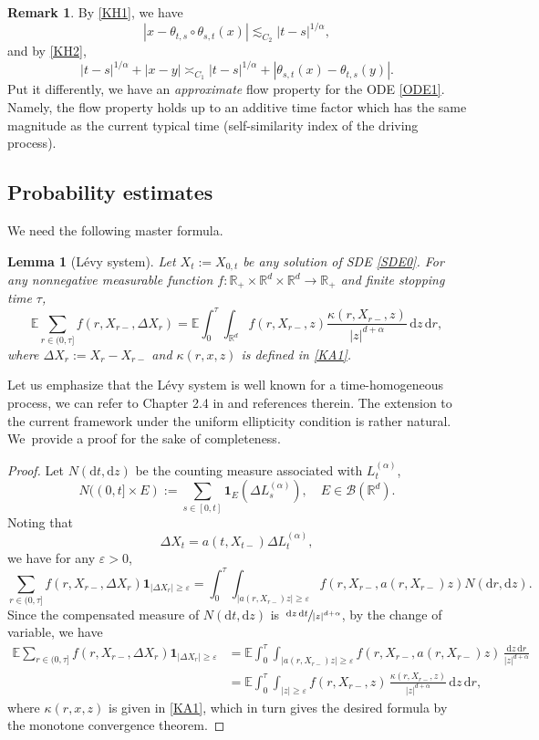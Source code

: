 \documentclass[JEP,XML,SOM,Unicode,published]{cedram}
\newcommand{\rd}{\mathrm{d}}
\theoremstyle{plain}
\newtheorem{lemma}[theorem]{Lemma}
\theoremstyle{definition}
\newtheorem{remark}[theorem]{Remark}
\let\eps\varepsilon
\newcommand\mE{\mathbb{E}}
\newcommand\mR{\mathbb{R}}
\newcommand\1{{\mathbf{1}}}
\newcommand\sB{{\mathscr B}}
\newcommand{\dif}{\,\mathrm{d}}
\begin{document}
\begin{remark}
By \eqref{KH1}, we have
\begin{equation*}%
|x-\theta_{t,s}\circ\theta_{s,t}(x)|\lesssim_{C_2} |t-s|^{1/\alpha},
\end{equation*}
and by \eqref{KH2},
\begin{equation}\label{KH22}
|t-s|^{1/\alpha}+|x-y|\asymp_{C_1}|t-s|^{1/\alpha}+|\theta_{s,t}(x)-\theta_{t,s}(y)|.
\end{equation}
Put it differently, we have an \textit{approximate} flow property for the ODE \eqref{ODE1}. Namely, the flow property holds up to an additive time factor which has the same magnitude as the current typical time (self-similarity index of the driving process).
\end{remark}
\subsection{Probability estimates}

We need the following master formula.
\begin{lemma}[Lévy system]\label{Le24}
Let $X_t:=X_{0,t}$ be any solution of SDE \eqref{SDE0}.
For any nonnegative measurable function $f: \mR_+\times\mR^d\times\mR^d\to\mR_+$ and finite stopping time $\tau$,
\[
\mE\sum_{r\in(0,\tau]}f(r, X_{r-}, \Delta X_r)=\mE\int^\tau_0\!\!\!\int_{\mR^d}f(r, X_{r-}, z)\frac{\kappa(r,X_{r-},z)}{|z|^{d+\alpha}}\dif z\dif r,
\]
where $\Delta X_r:=X_r-X_{r-}$ and $\kappa(r,x,z)$ is defined in \eqref{KA1}.
\end{lemma}
Let us emphasize that the Lévy system is well known for a time-homogeneous process, we can \eg refer to Chapter 2.4 in \cite{bott:schi:wang:13} and references therein. The extension to the current framework under the uniform ellipticity condition is rather natural. We~provide a proof for the sake of completeness.
\begin{proof}
Let $N(\rd t,\rd z)$ be the counting measure associated with $L^{(\alpha)}_t$, \ie
\[
N((0,t]\times E):=\sum_{s\in[0,t]}\1_E(\Delta L^{(\alpha)}_s),\quad E\in\sB(\mR^d).
\]
Noting that
\[
\Delta X_t=a(t,X_{t-})\Delta L^{(\alpha)}_t,
\]
we have for any $\eps>0$,
\[
\sum_{r\in(0,\tau]}f(r, X_{r-}, \Delta X_r)
\1_{|\Delta X_r|\geq\eps}
=\int^\tau_0\!\!\!
\int_{|{a(r,X_{r-})z}|\geq\eps}
f(r, X_{r-}, a(r,X_{r-})z)
N(\rd r,\rd z).
\]
Since the compensated measure of $N(\rd t,\rd z)$ is $\sfrac{\dif z\dif t}{|z|^{d+\alpha}}$,
by the change of variable, we have
\begin{align*}
\mE\sum_{r\in(0,\tau]}f(r, X_{r-}, \Delta X_r)
\1_{|\Delta X_r|\geq\eps}
&=\mE\int^\tau_0\!\!\!
\int_{|{a(r,X_{r-})z}|\geq\eps}
f(r, X_{r-}, a(r,X_{r-})z)\,\frac{\rd z\dif r}{|z|^{d+\alpha}}
\\&=\mE\int^\tau_0\!\!\!\int_{|z|\geq\eps}f(r, X_{r-}, z)\,\frac{\kappa(r,X_{r-},z)}{|z|^{d+\alpha}}\dif z\dif r,
\end{align*}
where $\kappa(r,x,z)$ is given in \eqref{KA1},
which in turn gives the desired formula by the monotone convergence theorem.
\end{proof}
\end{document}
